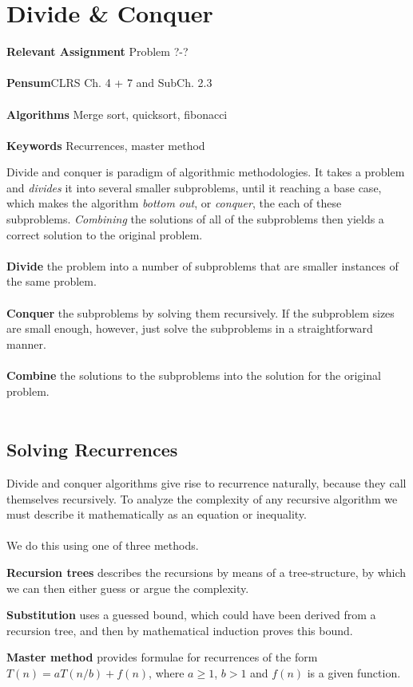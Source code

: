 
\chapter{Divide \& Conquer}
\label{ch:divideandconquer}

\textbf{Relevant Assignment} Problem ?-?\\\\
\textbf{Pensum}CLRS Ch. 4 + 7 and SubCh. 2.3\\\\
\textbf{Algorithms} Merge sort, quicksort, fibonacci\\\\
\textbf{Keywords} Recurrences, master method
\vspace{1in}

\noindent Divide and conquer is paradigm of algorithmic methodologies. It
takes a problem and \textit{divides} it into several smaller subproblems,
until it reaching a base case, which makes the algorithm \textit{bottom out},
or \textit{conquer}, the each of these subproblems. \textit{Combining} the
solutions of all of the subproblems then yields a correct solution to the
original problem.
\\\\
\noindent \textbf{Divide} the problem into a number of subproblems that are
smaller instances of the same problem.
\\\\
\noindent \textbf{Conquer} the subproblems by solving them recursively. If the
subproblem sizes are small enough, however, just solve the subproblems in a
straightforward manner.
\\\\
\noindent \textbf{Combine} the solutions to the subproblems into the solution
for the original problem.
\\\\

\section{Solving Recurrences}
Divide and conquer algorithms give rise to recurrence naturally, because they
call themselves recursively. To analyze the complexity of any recursive
algorithm we must describe it mathematically as an equation or inequality.
\\\\
We do this using one of three methods.
\begin{description}
	\item \textbf{Recursion trees} describes the recursions by means of a
tree-structure, by which we can then either guess or argue the complexity.
	\item \textbf{Substitution} uses a guessed bound, which could have been
derived from a recursion tree, and then by mathematical induction proves this
bound.
	\item \textbf{Master method} provides formulae for recurrences of the form
$T(n) = a T(n/b) + f(n)$, where $a \geq 1$, $b > 1$ and $f(n)$ is a given
function.
\end{description}

